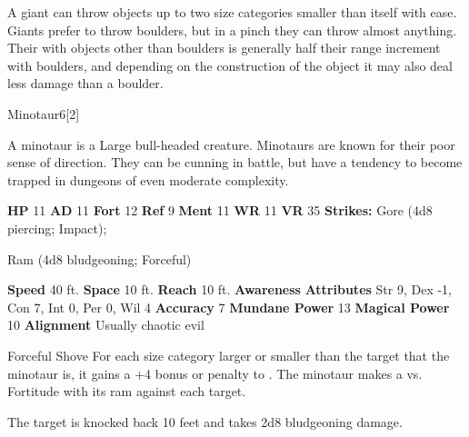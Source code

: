         A giant can throw objects up to two size categories smaller than itself with ease.
        Giants prefer to throw boulders, but in a pinch they can throw almost anything.
        Their  with objects other than boulders is generally half their range increment with boulders, and depending on the construction of the object it may also deal less damage than a boulder.
  
  
  \begin{monsection}{Minotaur}{6}[2]
    \vspace{-1em}\vspace{-1em}
    \vspace{0em}

    
        A minotaur is a Large bull-headed creature.
        Minotaurs are known for their poor sense of direction.
        They can be cunning in battle, but have a tendency to become trapped in dungeons of even moderate complexity.
      

    \begin{spellcontent}
      \begin{spelltargetinginfo}
        \pari \textbf{HP} 11 \monsep
          \textbf{AD} 11 \monsep
          \textbf{Fort} 12 \monsep
          \textbf{Ref} 9 \monsep
          \textbf{Ment} 11
        \pari \textbf{WR} 11 \monsep
        \textbf{VR} 35
        \pari \textbf{Strikes:}
            Gore  (4d8 piercing; Impact);
\par Ram  (4d8 bludgeoning; Forceful)
      \end{spelltargetinginfo}
    \end{spellcontent}
    \begin{monsterfooter}
      \pari \textbf{Speed} 40 ft. \monsep
        \textbf{Space} 10 ft. \monsep
        \textbf{Reach} 10 ft.
      \pari \textbf{Awareness} 
      \pari \textbf{Attributes}
        Str 9, Dex -1,
        Con 7, Int 0,
        Per 0, Wil 4
      \pari \textbf{Accuracy} 7 \monsep
        \textbf{Mundane Power} 13 \monsep
      \textbf{Magical Power} 10
      \pari \textbf{Alignment} Usually chaotic evil
    \end{monsterfooter}
  \end{monsection}
  \begin{freeability}{Forceful Shove}
      For each size category larger or smaller than the target that the minotaur is, it gains a +4 bonus or penalty to . The minotaur makes a 
         vs. Fortitude
        with its ram against each target.
    
    \hit The target is knocked back 10 feet and takes 2d8 bludgeoning damage.
    \end{freeability}
  
